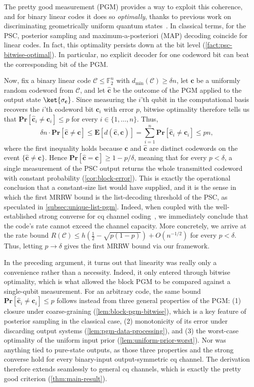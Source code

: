 \documentclass[11pt]{article}
\renewcommand{\leq}{\leqslant}
\renewcommand{\geq}{\geqslant}
\theoremstyle{remark}
\newcommand{\cC}{\mathcal{C}}
\newcommand{\F}{\mathbb{F}}
\newcommand{\Eb}{\mathbf{E}}
\newcommand{\Prb}{\mathbf{Pr}}
\newcommand{\bchat}{\hat{\mathbf{c}}}
\newcommand{\bc}{\mathbf{c}}
\begin{document}
The pretty good measurement (PGM) provides a way to exploit this coherence, and for binary linear codes it does so \emph{optimally}, thanks to previous work on discriminating geometrically uniform quantum states~\cite{BKMH97,UTHH99,EF01,EMV04,ZCCL25,RP21,PR25}. In classical terms, for the PSC, posterior sampling and maximum-a-posteriori (MAP) decoding coincide for linear codes. In fact, this optimality persists down at the bit level (\cref{fact:psc-bitwise-optimal}). In particular, no explicit decoder for one codeword bit can beat the corresponding bit of the PGM.

Now, fix a binary linear code $\cC \leq \F_2^n$ with $d_{\min}(\cC) \geq \delta n$, let $\bc$ be a uniformly random codeword from $\cC$, and let $\bchat$ be the outcome of the PGM applied to the output state $\ket{\sigma_{\bc}}$. Since measuring the $i$'th qubit in the computational basis recovers the $i$'th codeword bit $\bc_i$ with error $p$, bitwise optimality therefore tells us that $\Prb[\bchat_i \neq \bc_i] \leq p$ for every $i \in \{1, \ldots , n\}$. Thus,
\begin{equation*}
\delta n \cdot \Prb[\bchat \neq \bc]
\leq \Eb[d(\bchat,\bc)]
= \sum_{i=1}^{n}{\Prb[\bchat_i \neq \bc_i]}
\leq pn,
\end{equation*}
where the first inequality holds because $\bc$ and $\bchat$ are distinct codewords on the event $\{\bchat \neq \bc\}$. Hence $\Prb[\bchat = \bc] \geq 1-p/\delta$, meaning that for every $p < \delta$, a single measurement of the PSC output returns the whole transmitted codeword with constant probability (\cref{cor:block-error}). This is exactly the operational conclusion that a constant-size list would have supplied, and it is the sense in which the first MRRW bound is the list-decoding threshold of the PSC, as speculated in \cref{subsec:unique-list-pgm}. Indeed, when coupled with the well-established strong converse for cq channel coding~\cite{Win99a,ON99,MO17}, we immediately conclude that the code's rate cannot exceed the channel capacity. More concretely, we arrive at the rate bound $R(\cC) \leq h(\frac{1}{2}-\sqrt{p(1-p)})+O(n^{-1/2})$ for every $p < \delta$. Thus, letting $p \to \delta$ gives the first MRRW bound via our framework.

In the preceding argument, it turns out that linearity was really only a convenience rather than a necessity. Indeed, it only entered through bitwise optimality, which is what allowed the block PGM to be compared against a single-qubit measurement. For an arbitrary code, the same bound $\Prb[\bchat_i \neq \bc_i] \leq p$ follows instead from three general properties of the PGM: (1) closure under coarse-graining (\cref{lem:block-pgm-bitwise}), which is a key feature of posterior sampling in the classical case, (2) monotonicity of its error under discarding output systems (\cref{lem:pgm-data-processing}), and (3) the worst-case optimality of the uniform input prior (\cref{lem:uniform-prior-worst}). Nor was anything tied to pure-state outputs, as those three properties and the strong converse hold for every binary-input output-symmetric cq channel. The derivation therefore extends seamlessly to general cq channels, which is exactly the pretty good criterion (\cref{thm:main-result}).
\end{document}
